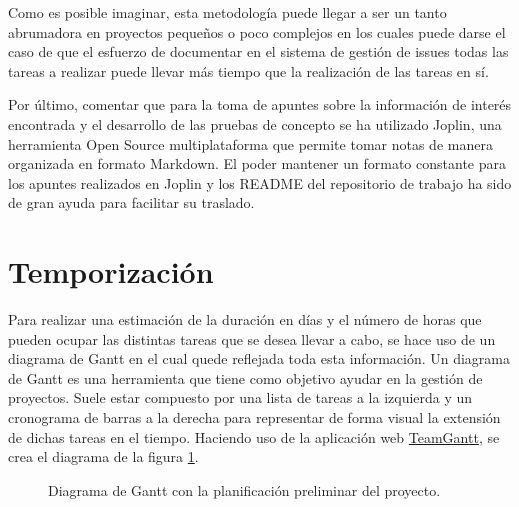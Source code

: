 Como es posible imaginar, esta metodología puede llegar a ser un tanto abrumadora en proyectos pequeños o poco 
complejos en los cuales puede darse el caso de que el esfuerzo de documentar en el sistema de gestión de issues 
todas las tareas a realizar puede llevar más tiempo que la realización de las tareas en sí.

Por último, comentar que para la toma de apuntes sobre la información de interés encontrada y el desarrollo de 
las pruebas de concepto se ha utilizado Joplin, una herramienta Open Source multiplataforma que 
permite tomar notas de manera organizada en formato Markdown. El poder mantener un formato constante para los apuntes
realizados en Joplin y los README del repositorio de trabajo ha sido de gran ayuda para facilitar su traslado.

\section{Temporización}
Para realizar una estimación de la duración en días y el número de horas que pueden ocupar las distintas tareas que se desea 
llevar a cabo, se hace uso de un diagrama de Gantt en el cual quede reflejada toda esta información. Un diagrama de 
Gantt es una herramienta que tiene como objetivo ayudar en la gestión de proyectos. Suele estar compuesto por una lista 
de tareas a la izquierda y un cronograma de barras a la derecha para representar de forma visual la extensión de dichas 
tareas en el tiempo. Haciendo uso de la aplicación web \hyperlink{https://www.teamgantt.com/}{TeamGantt}, se crea el 
diagrama de la figura \ref{fig:gantt}.\bigskip
\begin{figure}[H]
    \caption{Diagrama de Gantt con la planificación preliminar del proyecto.}
    \label{fig:gantt}
\end{figure}

